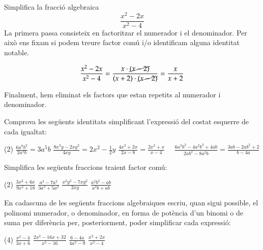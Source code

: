 \begin{resolt}{Simplifica la fracció algebraica \[ \frac{x^2-2x}{x^2 - 4} \]}
	La primera passa consisteix en factoritzar el numerador i el denominador. Per això ens fixam si podem treure factor comú i/o identificam alguna identitat notable.
	
	\[ \frac{x^2-2x}{x^2 - 4} = \frac{x \cdot \cancel{(x-2)}}{(x + 2)\cdot \cancel{(x-2)}} = \frac{x}{x + 2} \]
	
	Finalment, hem eliminat els factors que estan repetits al numerador i denominador.
\end{resolt}
 
\begin{mylist}

\exer  Comprova les següents identitats simplificant l'expressió del costat esquerre de cada igualtat: 

\begin{tasks}(2)
	\task $\frac{6a^{8} b^{2} }{2a^{3} b} =3a^{5} b$    
	\task  $\frac{8x^{3} y-2xy^{2} }{4xy} =2x^{2} -\frac{1}{2} y$ 
	\task $\frac{4x^{2} +2x}{2x-8} =\frac{2x^{2} +x}{x-4} \quad $   
	\task  $\frac{6a^{2} b^{2} -4a^{2} b^{3} +4ab}{2ab^{2} -8a^{2} b} =\frac{3ab-2ab^{2} +2}{b-4a} $
\end{tasks}

\exer  Simplifica les següents fraccions traient factor comú:

\begin{tasks}(2)
	\task  $\frac{3x^{2} +6x}{9x^{2} +18} $   
	\task  $\frac{a^{3} -7a^{2} }{3a^{3} +5a^{2} } $   
	\task  $\frac{x^{2} y^{2} -7xy^{2} }{2xy} $   
	\task $\frac{a^{2} b^{2} -ab}{a^{3} b+ab} $
\end{tasks}


\answers[cols=1]{[$\frac{3x(x+2)}{3(3x^2+6)}=\frac{x(x+2)}{3x^2+6}$,
	$\frac{a^2(a-7)}{a^2(3a+5)}=\frac{a-7}{3a+5}$,
	$\frac{ay(xy-7y)}{2xy}=\frac{y(x-7)}{2}$,
	$\frac{ab(ab-1)}{ab(a^2+1)}=\frac{ab-1}{a^2-1}$]}


\exer[1] En cadascuna de les següents fraccions algebraiques escriu, quan sigui possible, el polinomi numerador, o denominador, en forma de potència d'un binomi o de suma per diferència per, posteriorment, poder simplificar cada expressió: 

\begin{tasks}(4)
	\task  $\frac{x^{2} -4}{3x+6} $    
	\task $\frac{2x^{2} -16x+32}{x^{2} -16} $   
	\task  $\frac{6-4a}{4a^{2} -9} $
	\task  $\frac{x^2+2x}{x^2-4}$
\end{tasks}
\end{mylist}




